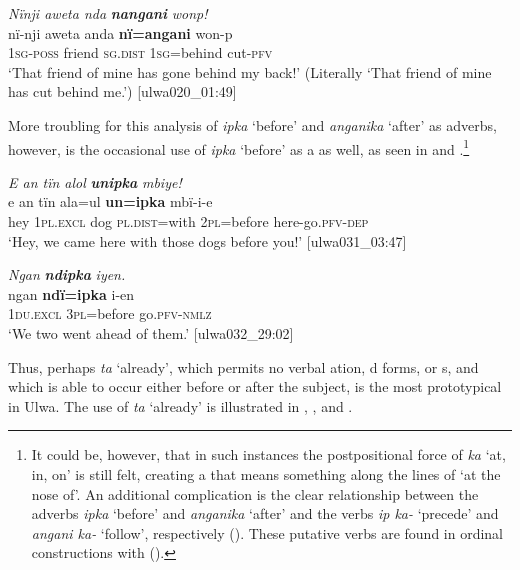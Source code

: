 \ea%
    \label{ex:otherwc:66}
          \textit{Nïnji aweta nda} \textbf{\textit{nangani}} \textit{wonp!}\\
\gll    nï-nji    aweta  anda    \textbf{nï=angani}    won-p\\
    \textsc{1sg-poss}  friend  \textsc{sg.dist}  1\textsc{sg}=behind  cut-\textsc{pfv}\\
\glt `That friend of mine has gone behind my back!’ (Literally ‘That friend of mine has cut behind me.’) [ulwa020\_01:49]
\z

More troubling for this analysis of \textit{ipka} ‘before’ and \textit{anganika} ‘after’ as adverbs, however, is the occasional use of \textit{ipka} ‘before’ as a  as well, as seen in  and .\footnote{It could be, however, that in such instances the postpositional force of \textit{ka} ‘at, in, on’ is still felt, creating a  that means something along the lines of ‘at the nose of’. An additional complication is the clear relationship between the adverbs \textit{ipka} ‘before’ and \textit{anganika} ‘after’ and the verbs \textit{ip ka-} ‘precede’ and \textit{angani ka-} ‘follow’, respectively (). These putative verbs are found in  ordinal constructions with   ().}

\ea%
    \label{ex:otherwc:67}
          \textit{E an tïn alol} \textbf{\textit{unipka}} \textit{mbiye!}\\
\gll    e  an      tïn    ala=ul      \textbf{un=ipka}    mbï-i-e\\
    hey  \textsc{1pl.excl}  dog  \textsc{pl.dist}=with  \textsc{2pl}=before  here-go.\textsc{pfv-dep}\\
\glt `Hey, we came here with those dogs before you!’ [ulwa031\_03:47]
\z

\ea%
    \label{ex:otherwc:68}
          \textit{Ngan} \textbf{\textit{ndipka}} \textit{iyen.}\\
\gll    ngan    \textbf{ndï=ipka}    i-en\\
    1\textsc{du.excl}  3\textsc{pl}=before  go.\textsc{pfv-nmlz}\\
\glt `We two went ahead of them.’ [ulwa032\_29:02]
\z

  Thus, perhaps \textit{ta} ‘already’, which permits no verbal  ation, d forms, or  s, and which is able to occur either before or after the subject, is the most prototypical  in Ulwa. The use of \textit{ta} ‘already’ is illustrated in , , and .

